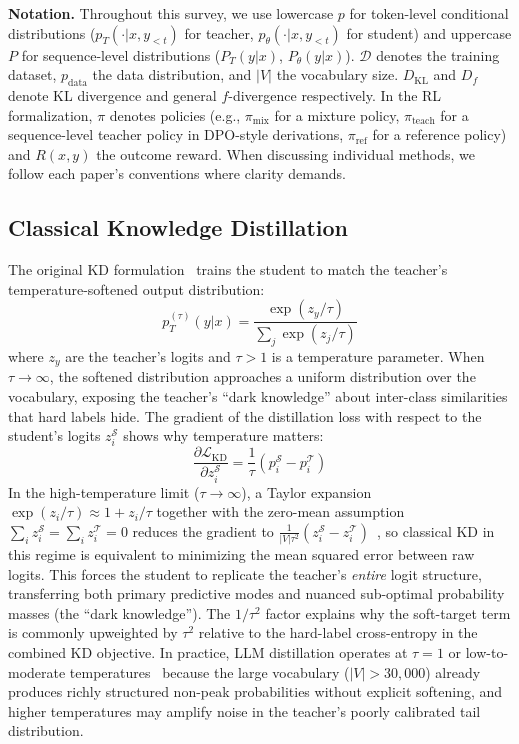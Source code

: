 \documentclass{article} %
\newcommand{\KL}{D_{\mathrm{KL}}}
\newcommand{\ptheta}{p_\theta}
\newcommand{\pteacher}{p_T}
\newcommand{\pdata}{p_{\mathrm{data}}}
\newcommand{\loss}{\mathcal{L}}
\begin{document}
\textbf{Notation.} Throughout this survey, we use lowercase $p$ for token-level conditional distributions ($\pteacher(\cdot|x, y_{<t})$ for teacher, $\ptheta(\cdot|x, y_{<t})$ for student) and uppercase $P$ for sequence-level distributions ($P_T(y|x)$, $P_\theta(y|x)$). $\mathcal{D}$ denotes the training dataset, $\pdata$ the data distribution, and $|V|$ the vocabulary size. $\KL$ and $D_f$ denote KL divergence and general $f$-divergence respectively. In the RL formalization, $\pi$ denotes policies (e.g., $\pi_{\mathrm{mix}}$ for a mixture policy, $\pi_{\text{teach}}$ for a sequence-level teacher policy in DPO-style derivations, $\pi_{\text{ref}}$ for a reference policy) and $R(x,y)$ the outcome reward. When discussing individual methods, we follow each paper's conventions where clarity demands.

\subsection{Classical Knowledge Distillation}

The original KD formulation~\citep{hinton2015distilling} trains the student to match the teacher's temperature-softened output distribution:
\begin{equation}
    p_T^{(\tau)}(y|x) = \frac{\exp(z_y / \tau)}{\sum_{j} \exp(z_j / \tau)}
\end{equation}
where $z_y$ are the teacher's logits and $\tau > 1$ is a temperature parameter. When $\tau \to \infty$, the softened distribution approaches a uniform distribution over the vocabulary, exposing the teacher's ``dark knowledge'' about inter-class similarities that hard labels hide. The gradient of the distillation loss with respect to the student's logits $z_i^{\mathcal{S}}$ shows why temperature matters:
\begin{equation}
    \frac{\partial \loss_{\text{KD}}}{\partial z_i^{\mathcal{S}}} = \frac{1}{\tau}(p_i^{\mathcal{S}} - p_i^{\mathcal{T}})
\end{equation}
In the high-temperature limit ($\tau \to \infty$), a Taylor expansion $\exp(z_i/\tau) \approx 1 + z_i/\tau$ together with the zero-mean assumption $\sum_i z_i^{\mathcal{S}} = \sum_i z_i^{\mathcal{T}} = 0$ reduces the gradient to $\frac{1}{|V|\tau^2}(z_i^{\mathcal{S}} - z_i^{\mathcal{T}})$~\citep{hinton2015distilling}, so classical KD in this regime is equivalent to minimizing the mean squared error between raw logits. This forces the student to replicate the teacher's \emph{entire} logit structure, transferring both primary predictive modes and nuanced sub-optimal probability masses (the ``dark knowledge''). The $1/\tau^2$ factor explains why the soft-target term is commonly upweighted by $\tau^2$ relative to the hard-label cross-entropy in the combined KD objective. In practice, LLM distillation operates at $\tau = 1$ or low-to-moderate temperatures~\citep{2402.11890} because the large vocabulary ($|V| > 30{,}000$) already produces richly structured non-peak probabilities without explicit softening, and higher temperatures may amplify noise in the teacher's poorly calibrated tail distribution.
\end{document}
